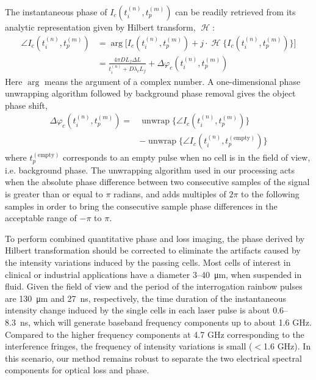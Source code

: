 \documentclass[aps,pra,reprint,superscriptaddress]{revtex4-1}
\DeclareMathOperator{\hilbert}{\mathcal{H}} %
\DeclareMathOperator{\unwrap}{unwrap} %
\begin{document}
The instantaneous phase of $I_c(t_i^{(n)}, t_p^{(m)})$ can be readily retrieved from its analytic representation given by Hilbert transform, $\hilbert$:
\begin{equation} \label{eqn:angle}
\begin{split}
\angle I_c(t_i^{(n)}, t_p^{(m)}) &= \arg\Big[I_c(t_i^{(n)}, t_p^{(m)}) + j \cdot \hilbert \lbrace I_c(t_i^{(n)}, t_p^{(m)}) \rbrace\Big] \\
&=  \frac{4\pi D L_f\Delta L}{t_i^{(n)} + D\lambda_c L_f} + \Delta \varphi_c(t_i^{(n)}, t_p^{(m)})
\end{split}
\end{equation}
Here $\arg$ means the argument of a complex number. A one-dimensional phase unwrapping algorithm followed by background phase removal gives the object phase shift, 
\begin{equation}
\begin{split}
\Delta\varphi_c(t_i^{(n)}, t_p^{(m)}) = &\unwrap \lbrace \angle I_c(t_i^{(n)}, t_p^{(m)}) \rbrace \\
&- \unwrap \lbrace \angle I_c(t_i^{(n)}, t_p^{(\text{empty})}) \rbrace
\end{split}
\end{equation}
where $t_p^{(\text{empty})}$ corresponds to an empty pulse when no cell is in the field of view, i.e. background phase. The unwrapping algorithm used in our processing acts when the absolute phase difference between two consecutive samples of the signal is greater than or equal to $\pi$ radians, and adds multiples of $2\pi$ to the following samples in order to bring the consecutive sample phase differences in the acceptable range of $-\pi$ to $\pi$. 

To perform combined quantitative phase and loss imaging, the phase derived by Hilbert transformation should be corrected to eliminate the artifacts caused by the intensity variations induced by the passing cells. Most cells of interest in clinical or industrial applications have a diameter 3--\SI{40}{\micro\meter}, when suspended in fluid. Given the field of view and the period of the interrogation rainbow pulses are \SI{130}{\micro\meter} and \SI{27}{\nano\second}, respectively, the time duration of the instantaneous intensity change induced by the single cells in each laser pulse is about 0.6--\SI{8.3}{\nano\second}, which will generate baseband frequency components up to about 1.6 GHz. Compared to the higher frequency components at 4.7 GHz corresponding to the interference fringes, the frequency of intensity variations is small ($<$1.6 GHz). In this scenario, our method remains robust to separate the two electrical spectral components for optical loss and phase.
\end{document}
